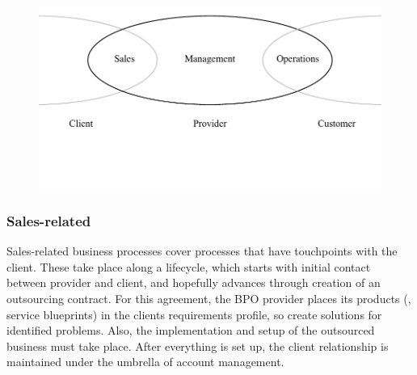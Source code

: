 	
	\begin{figure}[caption={BPO chain provider scope with stakeholders}, label={fig:bpochainscope}]
		{	\includegraphics[width=.8\textwidth]{figures/chain2.pdf}}
	\end{figure} 
	
	\subsubsection{Sales-related}
	Sales-related business processes cover processes that have touchpoints with the client. These take place along a lifecycle, which starts with initial contact between provider and client, and hopefully advances through creation of an outsourcing contract. For this agreement, the \acrshort{BPO} provider places its products (\ie, service blueprints) in the clients requirements profile, so create solutions for identified problems. Also, the implementation and setup of the outsourced business must take place. After everything is set up, the client relationship is maintained under the umbrella of account management. 
	
